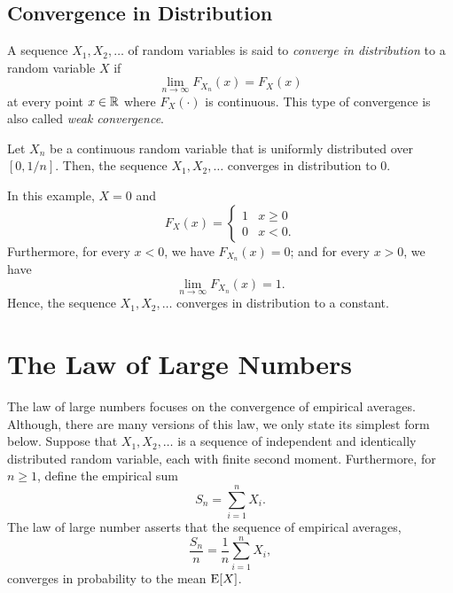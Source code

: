 \subsection{Convergence in Distribution}

A sequence $X_1, X_2, \ldots$ of random variables is said to \emph{converge in distribution} to a random variable $X$ if 
\begin{equation*}
\lim_{n \rightarrow \infty} F_{X_n} (x) = F_X (x)
\end{equation*}
at every point $x \in \mathbb{R}$ where $F_X (\cdot)$ is continuous.
This type of convergence is also called \emph{weak convergence}.  

\begin{example}
Let $X_n$ be a continuous random variable that is uniformly distributed over $[0, 1/n]$.
Then, the sequence $X_1, X_2, \ldots$ converges in distribution to $0$.

In this example, $X = 0$ and
\begin{equation*}
F_X (x) = \begin{cases} 1 & x \geq 0 \\
0 & x < 0. \end{cases}
\end{equation*}
Furthermore, for every $x < 0$, we have $F_{X_n} (x) = 0$; and for every $x > 0$, we have
\begin{equation*}
\lim_{n \rightarrow \infty} F_{X_n} (x) = 1.
\end{equation*}
Hence, the sequence $X_1, X_2, \ldots$ converges in distribution to a constant.
\end{example}


\section{The Law of Large Numbers}

The law of large numbers focuses on the convergence of empirical averages.
Although, there are many versions of this law, we only state its simplest form below.
Suppose that $X_1, X_2, \ldots$ is a sequence of independent and identically distributed random variable, each with finite second moment.
Furthermore, for $n \geq 1$, define the empirical sum
\begin{equation*}
S_n = \sum_{i=1}^n X_i .
\end{equation*}
The law of large number asserts that the sequence of empirical averages,
\begin{equation*}
\frac{S_n}{n} = \frac{1}{n} \sum_{i=1}^n X_i ,
\end{equation*}
converges in probability to the mean $\mathrm{E} [X]$.

